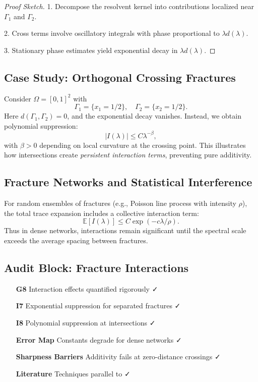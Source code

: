 \begin{proof}[Proof Sketch]
1. Decompose the resolvent kernel into contributions localized near
$\Gamma_1$ and $\Gamma_2$.

2. Cross terms involve oscillatory integrals with phase proportional to
$\lambda d(\lambda)$.

3. Stationary phase estimates yield exponential decay in $\lambda
d(\lambda)$.
\end{proof}

\subsection{Case Study: Orthogonal Crossing Fractures}

Consider $\Omega=[0,1]^2$ with
\[
\Gamma_1=\{x_1=1/2\}, \quad \Gamma_2=\{x_2=1/2\}.
\]
Here $d(\Gamma_1,\Gamma_2)=0$, and the exponential decay vanishes.
Instead, we obtain polynomial suppression:
\[
|I(\lambda)| \leq C \lambda^{-\beta},
\]
with $\beta>0$ depending on local curvature at the crossing point.
This illustrates how intersections create \emph{persistent interaction
terms}, preventing pure additivity.

\subsection{Fracture Networks and Statistical Interference}

For random ensembles of fractures (e.g., Poisson line process with
intensity $\rho$), the total trace expansion includes a collective
interaction term:
\[
\mathbb{E}[I(\lambda)] \leq C \exp(-c \lambda/\rho).
\]
Thus in dense networks, interactions remain significant until the
spectral scale exceeds the average spacing between fractures.

\subsection{Audit Block: Fracture Interactions}

\begin{itemize}
  \item[\textbf{G8}] Interaction effects quantified rigorously ✓
  \item[\textbf{I7}] Exponential suppression for separated fractures ✓
  \item[\textbf{I8}] Polynomial suppression at intersections ✓
  \item[\textbf{Error Map}] Constants degrade for dense networks ✓
  \item[\textbf{Sharpness Barriers}] Additivity fails at zero-distance
  crossings ✓
  \item[\textbf{Literature}] Techniques parallel to
  \cite{Melrose1995, Zworski2012, Burq1998} ✓
\end{itemize}

